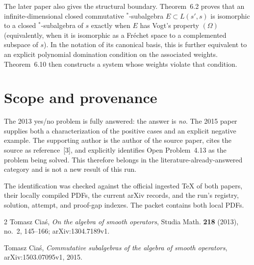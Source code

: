 \documentclass[11pt]{article}
\begin{document}
The later paper also gives the structural boundary.  Theorem~6.2 proves that
an infinite-dimensional closed commutative $^*$-subalgebra $E\subset L(s',s)$
is isomorphic to a closed $^*$-subalgebra of $s$ exactly when $E$ has Vogt's
property $(\Omega)$ (equivalently, when it is isomorphic as a Fr\'echet space
to a complemented subspace of $s$).  In the notation of its canonical basis,
this is further equivalent to an explicit polynomial domination condition on
the associated weights.  Theorem~6.10 then constructs a system whose weights
violate that condition.

\section*{Scope and provenance}

The 2013 yes/no problem is fully answered: the answer is \emph{no}.  The 2015
paper supplies both a characterization of the positive cases and an explicit
negative example.  The supporting author is the author of the source paper,
cites the source as reference~[3], and explicitly identifies Open
Problem~4.13 as the problem being solved.  This therefore belongs in the
literature-already-answered category and is not a new result of this run.

The identification was checked against the official ingested TeX of both
papers, their locally compiled PDFs, the current arXiv records, and the run's
registry, solution, attempt, and proof-gap indexes.  The packet contains both
local PDFs.

\begin{thebibliography}{2}
Tomasz Cia\'s,
\emph{On the algebra of smooth operators},
Studia Math. \textbf{218} (2013), no.~2, 145--166;
arXiv:1304.7189v1.

Tomasz Cia\'s,
\emph{Commutative subalgebras of the algebra of smooth operators},
arXiv:1503.07095v1, 2015.
\end{thebibliography}
\end{document}
